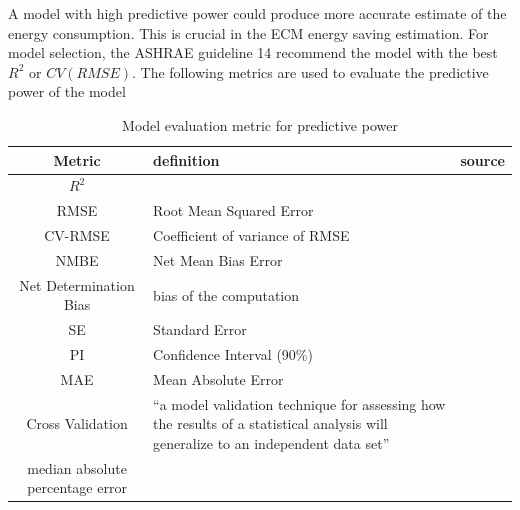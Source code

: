 \documentclass[12pt]{article}
\begin{document}
A model with high predictive power could produce more accurate
estimate of the energy consumption. This is crucial in the ECM energy
saving estimation. For model selection, the ASHRAE guideline 14
recommend the model with the best $R^2$ or $CV(RMSE)$. The following
metrics are used to evaluate the predictive power of the model
\begin{table}[h!]
\centering
\tiny
\begin{tabular}{c|p{5cm}|c}
  \hline
  Metric  &definition                       &source              \\
  \hline
  \hline
  $R^2$   &                                 &\cite{edition2013ashrae}\\
  \hline
  RMSE    &Root Mean Squared Error          &\cite{edition2013ashrae}\\
  \hline
  CV-RMSE &Coefficient of variance of RMSE  &\cite{edition2013ashrae, brown2012kernel}\\
  \hline
  NMBE    &Net Mean Bias Error              &\cite{edition2013ashrae}\\
  \hline
  Net Determination Bias& bias of the computation&~\cite{edition2013ashrae}\\
  \hline
  SE      &Standard Error                   &\cite{reddy1997baselining, hammarsten1987critical}\\
  \hline
  PI      &Confidence Interval (90\%)       &\cite{reddy1997baselining}\\
  \hline
  MAE     &Mean Absolute Error              &\cite{wytock2013contextually}\\
  \hline
  Cross Validation&``a model validation technique for assessing how the results of a statistical analysis will generalize to an independent data set''~\cite{cvWiki2016}&\cite{brown2012kernel}\\
  \hline
  median absolute percentage error&&\cite{granderson2014evaluation}\\
  \hline
\end{tabular}
\caption{Model evaluation metric for predictive power}
\label{tab:eval}
\end{table}
\FloatBarrier
\end{document}
